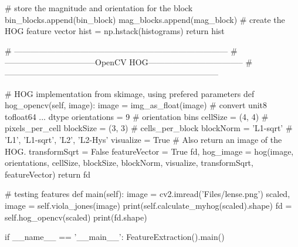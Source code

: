 \begin{pythoncode}
                # store the magnitude and orientation for the block
                bin_blocks.append(bin_block)
                mag_blocks.append(mag_block)
        # create the HOG feature vector
        hist = np.hstack(histograms)
        return hist

    # ------------------------------------------------------------------------------
    # ---------------------------------OpenCV HOG-----------------------------------
    # ------------------------------------------------------------------------------
	
    # HOG implementation from skimage, using prefered parameters
    def hog_opencv(self, image):
        image = img_as_float(image)  # convert unit8 tofloat64 ... dtype
        orientations = 9		# orientation bins
        cellSize = (4, 4)		# pixels_per_cell
        blockSize = (3, 3)		# cells_per_block
        blockNorm = 'L1-sqrt'	# {'L1', 'L1-sqrt', 'L2', 'L2-Hys'}
        visualize = True		# Also return an image of the HOG.
        transformSqrt = False
        featureVector = True
        fd, hog_image = hog(image, orientations, cellSize, 
        blockSize, blockNorm, visualize, transformSqrt,
                            featureVector)
        return fd
		
    # testing features 
    def main(self):
        image = cv2.imread('Files/lense.png')
		scaled, image = self.viola_jones(image)
        print(self.calculate_myhog(scaled).shape)
		fd = self.hog_opencv(scaled)
		print(fd.shape)


if __name__ == '__main__': FeatureExtraction().main()
       \end{pythoncode}

\clearpage
